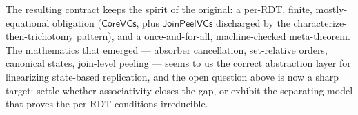 \documentclass[11pt]{article}
\newcommand{\co}{\mathsf{CoreVCs}}
\newcommand{\jp}{\mathsf{JoinPeelVCs}}
\begin{document}
The resulting contract keeps the spirit of the original: a per-RDT,
finite, mostly-equational obligation ($\co$, plus $\jp$ discharged by the
characterize-then-trichotomy pattern), and a once-and-for-all,
machine-checked meta-theorem. The mathematics that emerged --- absorber
cancellation, set-relative orders, canonical states, join-level peeling
--- seems to us the correct abstraction layer for linearizing state-based
replication, and the open question above is now a sharp target: settle
whether associativity closes the gap, or exhibit the separating model
that proves the per-RDT conditions irreducible.
\end{document}
